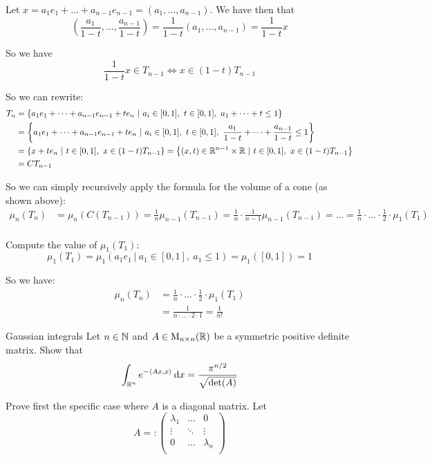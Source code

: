 \documentclass[12pt]{article}
\begin{document}
Let $x = a_1e_1 + \dots + a_{n-1}e_{n-1} = (a_1,\dots,a_{n-1})$. We have then that
$$
    (\frac{a_1}{1 - t}, \dots, \frac{a_{n-1}}{1 - t}) = \frac{1}{1-t}(a_1,\dots,a_{n-1}) = \frac{1}{1-t} x
$$

So we have 
$$
    \frac{1}{1-t} x \in T_{n-1} \iff x \in (1-t)T_{n-1}
$$

So we can rewrite:
$$
\begin{aligned}
    T_n &= \left\{ a_1e_1 + \dots + a_{n-1}e_{n-1} + te_n \ |\ a_i \in [0, 1],\ t \in [0, 1],\ a_1 + \dots + t \leq 1 \right\} \\
    &= \left\{ a_1e_1 + \dots + a_{n-1}e_{n-1} + te_n \ |\ a_i \in [0, 1],\ t \in [0, 1],\ \frac{a_1}{1 - t} + \dots + \frac{a_{n-1}}{1 - t} \leq 1 \right\} \\
    &= \left\{ x + te_n \ |\ t \in [0, 1],\ x \in (1-t)T_{n-1} \right\} = \left\{ (x, t) \in \mathbb{R}^{n-1} \times \mathbb{R} \ |\ t \in [0, 1],\ x \in (1-t)T_{n-1} \right\} \\
    &= CT_{n-1}
\end{aligned}
$$

So we can simply recursively apply the formula for the volume of a cone (as shown above):
$$
\begin{aligned}
    \mu_n(T_n) &= \mu_{n}\left(C(T_{n-1})\right) = \frac{1}{n} \mu_{n-1}(T_{n-1}) = \frac{1}{n}\cdot\frac{1}{n-1} \mu_{n-1}(T_{n-1}) = \dots = \frac{1}{n}\cdot \dots \cdot \frac{1}{2} \cdot \mu_1(T_1) \\
\end{aligned}
$$

Compute the value of $\mu_1(T_1)$:
$$
    \mu_1(T_1) = \mu_1({a_1e_1 \ |\ a_1 \in [0, 1],\ a_1 \leq 1 }) = \mu_1([0, 1]) = 1
$$

So we have:
$$
\begin{aligned}
    \mu_n(T_n) &= \frac{1}{n}\cdot \dots \cdot \frac{1}{2} \cdot \mu_1(T_1) \\
    &= \frac{1}{n \cdot \dots \cdot 2 \cdot 1} = \boxed{\frac{1}{n!}}
\end{aligned}
$$

\newpage

\begin{problem}{Gaussian integrals}{}
    Let $n \in \mathbb{N}$ and $A \in \mathrm{M}_{n\times n}(\mathbb{R})$ be a symmetric positive definite matrix. Show that
    $$
        \int_{\mathbb{R}^n} e^{-\langle Ax, x \rangle}\mathop{}\!\mathrm{d} x = \frac{\pi^{n/2}}{\sqrt{\det(A)}}
    $$
\end{problem}

Prove first the specific case where $A$ is a diagonal matrix. Let
$$
    A =: \begin{pmatrix}
        \lambda_1 & \dots & 0 \\
        \vdots & \ddots & \vdots \\
        0 & \dots & \lambda_n \\
    \end{pmatrix}
$$
\end{document}
